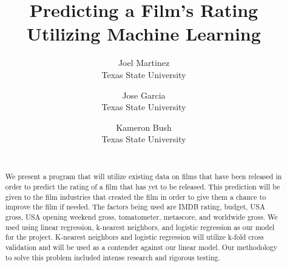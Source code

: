 \documentclass[10pt,twocolumn,letterpaper]{article}
\begin{document}
\title{Predicting a Film's Rating Utilizing Machine Learning}

\author{Joel Martinez\\
Texas State University\\
\and
Jose Garcia\\
Texas State University\\
\and
Kameron Bush\\
Texas State University\\\\
}
\maketitle

\begin{abstract}
	We present a program that will utilize existing data on films that have been released in order to predict
	the rating of a film that has yet to be released. This prediction will be given to the film industries that created the film in order to give them a chance to improve the film if needed. The factors being used are IMDB rating, budget, USA gross, USA opening weekend gross, tomatometer, metascore, and worldwide gross. We used using linear regression, k-nearest neighbors, and logistic regression as our model for the project. K-nearest neighbors and logistic regression will utilize k-fold cross validation and will be used as a contender against our linear model. Our methodology to solve this problem included intense research and rigorous testing.
\end{abstract}

\end{document}
